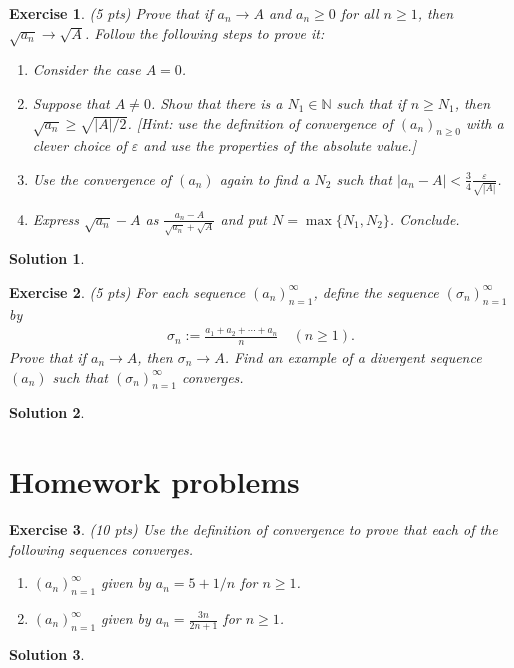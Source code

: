 \documentclass[12pt]{article}
\newcommand{\bN}{\mathbb{N}}
\newcommand{\ra}{\rightarrow}
\theoremstyle{plain}
\newtheorem{exer}{\textbf{Exercise}}}
\theoremstyle{plain}
\newtheorem*{sol}{\textbf{Solution}}}
\begin{document}
\begin{exer}
(5 pts)
Prove that if $a_n \ra A$ and $a_n \geq 0$ for all $n \geq 1$, then $\sqrt{a_n} \ra \sqrt{A}$. Follow the following steps to prove it:
	\begin{enumerate}
	\item Consider the case $A = 0$.
	\item Suppose that $A \neq 0$. Show that there is a $N_1 \in \bN$ such that if $n \geq N_1$, then $\sqrt{a_n} \geq \sqrt{|A|/2}$. [Hint: use the definition of convergence of $(a_n)_{n \geq 0}$ with a clever choice of $\varepsilon$ and use the properties of the absolute value.]
	\item Use the convergence of $(a_n)$ again to find a $N_2$ such that $|a_n - A| < \frac{3}{4} \frac{\varepsilon}{\sqrt{|A|}}$. 
	\item Express $\sqrt{a_n} - A$ as $\frac{a_n - A}{\sqrt{a_n} + \sqrt{A}}$ and put $N = \max \{ N_1 , N_2 \}$. Conclude.
	\end{enumerate}
\end{exer}
\begin{sol}

\end{sol}


\begin{exer}
(5 pts)
For each sequence $(a_n)_{n = 1}^\infty$, define the sequence $(\sigma_n)_{n = 1}^\infty$ by
	\begin{align*}
	\sigma_n := \frac{a_1 + a_2 + \cdots + a_n}{n} \quad (n \geq 1 ) .
	\end{align*}
Prove that if $a_n \ra A$, then $\sigma_n \ra A$. Find an example of a divergent sequence $(a_n)$ such that $(\sigma_n)_{n = 1}^\infty$ converges.
\end{exer}
\begin{sol}

\end{sol}

\section{Homework problems}
\begin{exer}
(10 pts)
Use the definition of convergence to prove that each of the following sequences converges.
	\begin{enumerate}[label=\textbf{\alph*)}]
	\item $(a_n )_{n = 1}^\infty$ given by $a_n = 5 + 1/n$ for $n \geq 1$.
	\item $(a_n)_{n = 1}^\infty$ given by $a_n = \frac{3n}{2n + 1}$ for $n \geq 1$.
	\end{enumerate}
\end{exer}
\begin{sol}

\end{sol}
\end{document}

